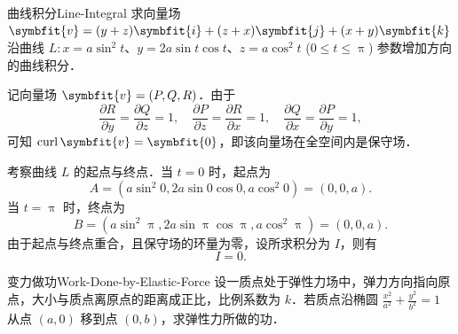 \begin{problem}{曲线积分}{Line-Integral}
    求向量场 $\symbfit{v} = (y + z)\symbfit{i} + (z + x)\symbfit{j} + (x + y)\symbfit{k}$ 沿曲线 $L: x = a \sin^2 t$、$y = 2a \sin t \cos t$、$z = a \cos^2 t$ ($0 \leqslant t \leqslant \uppi$) 参数增加方向的曲线积分．
\end{problem}

\begin{solution}
    记向量场 $\symbfit{v} = (P, Q, R)$．由于
    \begin{equation}
        \frac{\partial R}{\partial y} = \frac{\partial Q}{\partial z} = 1, \quad \frac{\partial P}{\partial z} = \frac{\partial R}{\partial x} = 1, \quad \frac{\partial Q}{\partial x} = \frac{\partial P}{\partial y} = 1,
    \end{equation}
    可知 $\operatorname{curl} \symbfit{v} = \symbfit{0}$，即该向量场在全空间内是保守场．

    考察曲线 $L$ 的起点与终点．当 $t = 0$ 时，起点为
    \begin{equation}
        A = (a \sin^2 0, 2a \sin 0 \cos 0, a \cos^2 0) = (0, 0, a).
    \end{equation}
    当 $t = \uppi$ 时，终点为
    \begin{equation}
        B = (a \sin^2 \uppi, 2a \sin \uppi \cos \uppi, a \cos^2 \uppi) = (0, 0, a).
    \end{equation}
    由于起点与终点重合，且保守场的环量为零，设所求积分为 $I$，则有
    \begin{equation}
        \boxed{I = 0}.
    \end{equation}
\end{solution}

\begin{problem}{变力做功}{Work-Done-by-Elastic-Force}
    设一质点处于弹性力场中，弹力方向指向原点，大小与质点离原点的距离成正比，比例系数为 $k$．若质点沿椭圆 $\frac{x^2}{a^2} + \frac{y^2}{b^2} = 1$ 从点 $(a, 0)$ 移到点 $(0, b)$，求弹性力所做的功．
\end{problem}

